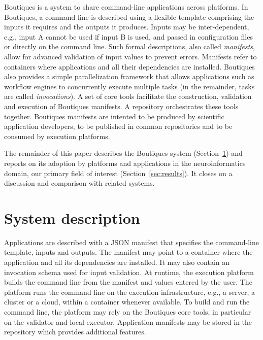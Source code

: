 \documentclass{article}
\newcommand{\note}[2]{\pdfmargincomment[color=yellow,author=#1,open=true]{#2}}
\newcommand{\boutiques}{Boutiques\xspace}
\begin{document}
\boutiques is a system to share command-line applications across
platforms. In \boutiques, a command line is described using a flexible
template comprising the inputs it requires and the outputs it
produces. Inputs may be inter-dependent, e.g., input A cannot be used
if input B is used, and passed in configuration files or directly on
the command line. Such formal descriptions, also called
\emph{manifests}, allow for advanced validation of input values to
prevent errors. Manifests refer to containers where applications and
all their dependencies are installed. \boutiques also provides a
simple parallelization framework that allows applications such as
workflow engines to concurrently execute multiple tasks (in the
remainder, tasks are called \emph{invocations}). A set of core tools
facilitate the construction, validation and execution of \boutiques
manifests. A repository orchestrates these tools together. \boutiques
manifests are intented to be produced by scientific application
developers, to be published in common repositories and to be consumed
by execution platforms.

The remainder of this paper describes the \boutiques system
(Section~\ref{sec:system}) and reports on its adoption by platforms
and applications in the neuroinformatics domain, our primary field of
interest (Section~\ref{sec:results}). It closes on a discussion and
comparison with related systems.


\section{System description}
\label{sec:system}

Applications are described with a JSON manifest that specifies the
command-line template, inputs and outputs. The manifest may point to a
container where the application and all its dependencies are
installed. It may also contain an invocation schema used for input
validation. At runtime, the execution platform builds the command line
from the manifest and values entered by the user. The platform runs
the command line on the execution infrastructure, e.g., a server, a
cluster or a cloud, within a container whenever available. To build
and run the command line, the platform may rely on the \boutiques core
tools, in particular on the validator and local executor. Application
manifests may be stored in the repository which provides additional
features.
\end{document}
